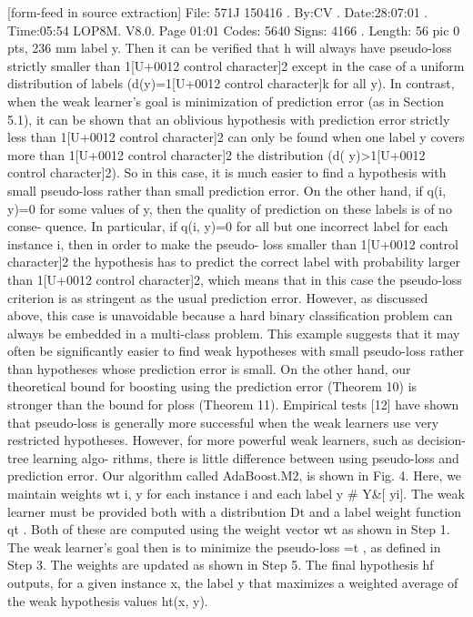 \documentclass[10pt]{article}
\begin{document}
\begin{ReviewVerbatim}
{{{{{{{{[form-feed in source extraction]
File: 571J 150416 . By:CV . Date:28:07:01 . Time:05:54 LOP8M. V8.0. Page 01:01
Codes: 5640 Signs: 4166 . Length: 56 pic 0 pts, 236 mm
label y. Then it can be verified that h will always have
pseudo-loss strictly smaller than 1[U+0012 control character]2 except in the case of a
uniform distribution of labels (d(y)=1[U+0012 control character]k for all y). In
contrast, when the weak learner's goal is minimization of
prediction error (as in Section 5.1), it can be shown that an
oblivious hypothesis with prediction error strictly less than
1[U+0012 control character]2 can only be found when one label y covers more than 1[U+0012 control character]2
the distribution (d( y)>1[U+0012 control character]2). So in this case, it is much
easier to find a hypothesis with small pseudo-loss rather
than small prediction error.
On the other hand, if q(i, y)=0 for some values of y, then
the quality of prediction on these labels is of no conse-
quence. In particular, if q(i, y)=0 for all but one incorrect
label for each instance i, then in order to make the pseudo-
loss smaller than 1[U+0012 control character]2 the hypothesis has to predict the
correct label with probability larger than 1[U+0012 control character]2, which means
that in this case the pseudo-loss criterion is as stringent as
the usual prediction error. However, as discussed above,
this case is unavoidable because a hard binary classification
problem can always be embedded in a multi-class problem.
This example suggests that it may often be significantly
easier to find weak hypotheses with small pseudo-loss rather
than hypotheses whose prediction error is small. On the
other hand, our theoretical bound for boosting using the
prediction error (Theorem 10) is stronger than the bound
for ploss (Theorem 11). Empirical tests [12] have shown
that pseudo-loss is generally more successful when the weak
learners use very restricted hypotheses. However, for more
powerful weak learners, such as decision-tree learning algo-
rithms, there is little difference between using pseudo-loss
and prediction error.
Our algorithm called AdaBoost.M2, is shown in Fig. 4.
Here, we maintain weights wt
i, y for each instance i and each
label y # Y&[ yi]. The weak learner must be provided both
with a distribution Dt and a label weight function qt . Both
of these are computed using the weight vector wt
as shown
in Step 1. The weak learner's goal then is to minimize the
pseudo-loss =t , as defined in Step 3. The weights are updated
as shown in Step 5. The final hypothesis hf outputs, for a
given instance x, the label y that maximizes a weighted
average of the weak hypothesis values ht(x, y).

}}}}}}}}
\end{ReviewVerbatim}
\end{document}
